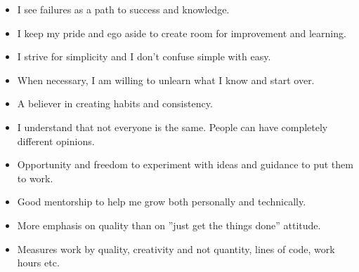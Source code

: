 \smallskip
\begin{itemize}
\item I see failures as a path to success and knowledge.
\smallskip
\item I keep my pride and ego aside to create room for improvement and learning.
\smallskip
\item I strive for simplicity and I don’t confuse simple with easy.
\smallskip
\item When necessary, I am willing to unlearn what I know and start over.
\smallskip
\item A believer in creating habits and consistency.
\smallskip
\item I understand that not everyone is the same. People can have completely different opinions.
\end{itemize}

\smallskip
\begin{itemize}
\item Opportunity and freedom to experiment with ideas and guidance to put them to work.
\smallskip
\item Good mentorship to help me grow both personally and technically.
\smallskip
\item More emphasis on quality than on ”just get the things done” attitude.
\smallskip
\item Measures work by quality, creativity and not quantity, lines of code, work hours etc.
\end{itemize}

